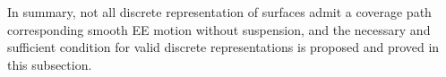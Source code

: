 \documentclass[Afour,sageh,times]{sagej}
\begin{document}
In summary, not all discrete representation of surfaces admit a coverage path corresponding smooth EE motion without suspension, and the necessary and sufficient condition for valid discrete representations is proposed and proved in this subsection. 

%
%
%
\end{document}
